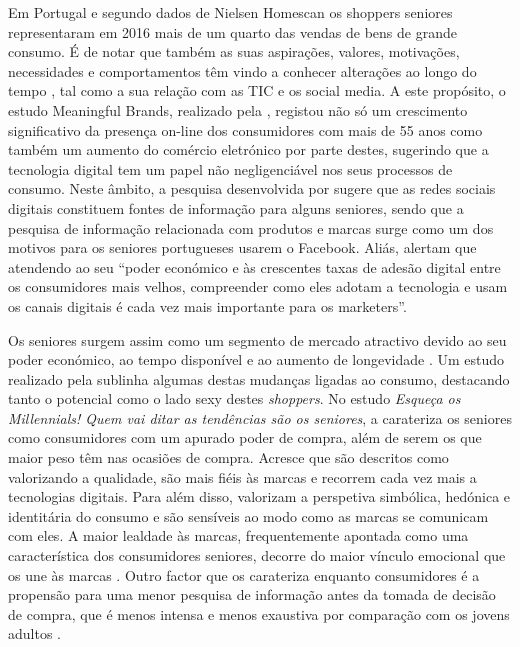 \documentclass[portuguese]{textolivre}
\begin{document}
Em Portugal e segundo dados de Nielsen Homescan \cite{pinto2017} os shoppers seniores representaram em 2016 mais de um quarto das vendas de bens de grande consumo. É de notar que também as suas aspirações, valores, motivações, necessidades e comportamentos têm vindo a conhecer alterações ao longo do tempo \cite{noble2003, nunan2019}, tal como a sua relação com as TIC e os social media. A este propósito, o estudo Meaningful Brands, realizado pela \textcite{havas2018}, registou não só um crescimento significativo da presença on-line dos consumidores com mais de 55 anos como também um aumento do comércio eletrónico por parte destes, sugerindo que a tecnologia digital tem um papel não negligenciável nos seus processos de consumo. Neste âmbito, a pesquisa desenvolvida por \textcite{miranda2020} sugere que as redes sociais digitais constituem fontes de informação para alguns seniores, sendo que a pesquisa de informação relacionada com produtos e marcas surge como um dos motivos para os seniores portugueses usarem o Facebook. Aliás, \textcite[p. 469]{nunan2019} alertam que atendendo ao seu “poder económico e às crescentes taxas de adesão digital entre os consumidores mais velhos, compreender como eles adotam a tecnologia e usam os canais digitais é cada vez mais importante para os marketers”.

Os seniores surgem assim como um segmento de mercado atractivo devido ao seu poder económico, ao tempo disponível e ao aumento de longevidade \cite{friemel2016}. Um estudo realizado pela \textcite{kantar2018} sublinha algumas destas mudanças ligadas ao consumo, destacando tanto o potencial como o lado sexy destes \emph{shoppers}. No estudo \emph{Esqueça os Millennials! Quem vai ditar as tendências são os seniores}, a \textcite{kantar2018} carateriza os seniores como consumidores com um apurado poder de compra, além de serem os que maior peso têm nas ocasiões de compra. Acresce que são descritos como valorizando a qualidade, são mais fiéis às marcas e recorrem cada vez mais a tecnologias digitais. Para além disso, valorizam a perspetiva simbólica, hedónica e identitária do consumo e são sensíveis ao modo como as marcas se comunicam com eles. A maior lealdade às marcas, frequentemente apontada como uma característica dos consumidores seniores, decorre do maior vínculo emocional que os une às marcas \cite{lambert-pandraud2010}. Outro factor que os carateriza enquanto consumidores é a propensão para uma menor pesquisa de informação antes da tomada de decisão de compra, que é menos intensa e menos exaustiva por comparação com os jovens adultos \cite{mata2010, lockenhoff2018}.
\end{document}
